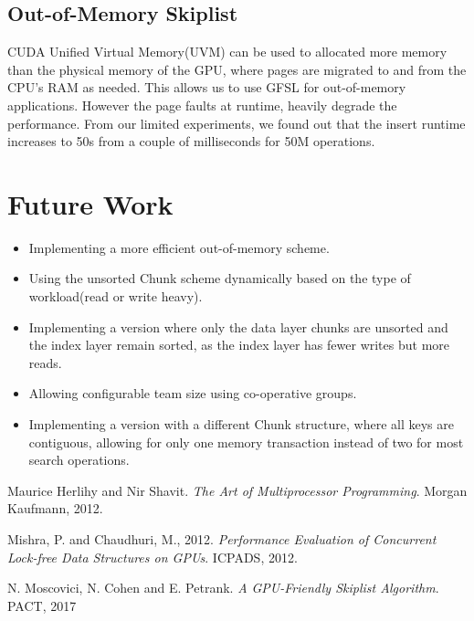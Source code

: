 \documentclass[12pt,a4paper]{article}
\begin{document}
\subsection{Out-of-Memory Skiplist}
CUDA Unified Virtual Memory(UVM) can be used to allocated more memory than the physical memory of the GPU, where pages are migrated to and from the CPU's RAM as needed. This allows us to use GFSL for out-of-memory applications. However the page faults at runtime, heavily degrade the performance. From our limited experiments, we found out that the insert runtime increases to 50s from a couple of milliseconds for 50M operations.

\section{Future Work}
\begin{itemize}
    \item Implementing a more efficient out-of-memory scheme.
    \item Using the unsorted Chunk scheme dynamically based on the type of workload(read or write heavy).
    \item Implementing a version where only the data layer chunks are unsorted and the index layer remain sorted, as the index layer has fewer writes but more reads.
    \item Allowing configurable team size using co-operative groups.
    \item Implementing a version with a different Chunk structure, where all keys are contiguous, allowing for only one memory transaction instead of two for most search operations. 
\end{itemize}


\begin{thebibliography}{9}
Maurice Herlihy and Nir Shavit. 
\textit{The Art of Multiprocessor Programming}. 
Morgan Kaufmann, 2012.

Mishra, P. and Chaudhuri, M., 2012.
\textit{Performance Evaluation of Concurrent Lock-free Data Structures on GPUs}. 
ICPADS, 2012.

N. Moscovici, N. Cohen and E. Petrank.
\textit{A GPU-Friendly Skiplist Algorithm}. 
PACT, 2017

\end{thebibliography}
\end{document}
